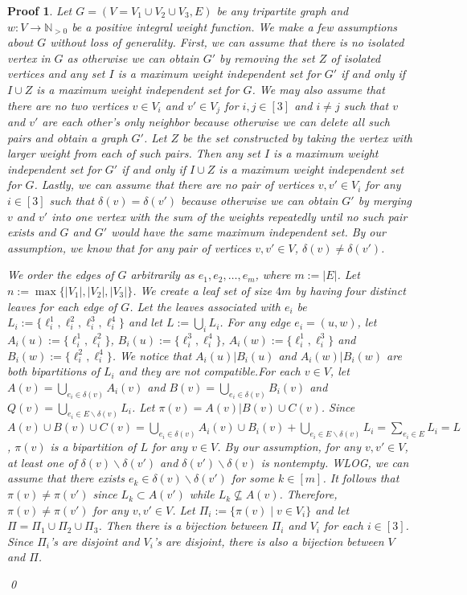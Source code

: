 \documentclass[twocolumn]{bmcart}%
\theoremstyle{mystyle}
\theoremstyle{proofstyle}
\newtheorem*{proof2}{Proof}
\newenvironment{proofnospace}{\begin{proof2}}{\qed \end{proof2}}
\begin{document}
\thmHardness*
\begin{proofnospace}
  Let $G = (V=V_1 \cup V_2 \cup V_3, E)$ be any tripartite graph and $w:V \to \mathbb{N}_{>0}$ be a positive integral weight function. We make a few assumptions about $G$ without loss of generality. First, we can assume that there is no isolated vertex in $G$ as otherwise we can obtain $G'$ by removing the set $Z$ of isolated vertices and any set $I$ is a maximum weight independent set for $G'$ if and only if $I \cup Z$ is a maximum weight independent set for $G$. We may also assume that there are no two vertices $v \in V_i$ and $v' \in V_j$ for $i,j \in [3]$ and $i \neq j$ such that $v$ and $v'$ are each other's only neighbor because otherwise we can delete all such pairs and obtain a graph $G'$. Let $Z$ be the set constructed by taking the vertex with larger weight from each of such pairs. Then any set $I$ is a maximum weight independent set for $G'$ if and only if $I \cup Z$ is a maximum weight independent set for $G$. Lastly, we can assume that there are no pair of vertices $v,v' \in V_i$ for any $i \in [3]$ such that $\delta(v) = \delta(v')$ because otherwise we can obtain $G'$ by merging $v$ and $v'$ into one vertex with the sum of the weights repeatedly until no such pair exists and $G$ and $G'$ would have the same maximum independent set. By our assumption, we know that for any pair of vertices $v,v'\in V$, $\delta(v) \neq \delta(v')$.
  
  We order the edges of $G$ arbitrarily as $e_1,e_2,\dots,e_m$, where $m:=|E|$. Let $n:= \max\{|V_1|,|V_2|,|V_3|\}$. We create a leaf set of size $4m$ by having four distinct leaves for each edge of $G$. Let the leaves associated with $e_i$ be $L_i := \{\ell_i^1,\ell_i^2,\ell_i^3,\ell_i^4\}$ and let $L := \bigcup_i L_i$. For any edge $e_i = (u,w)$, let $A_i(u) := \{\ell_i^1, \ell_i^2\}$, $B_i(u) := \{\ell_i^3, \ell_i^4\}$, $A_i(w) := \{\ell_i^1, \ell_i^3\}$ and $B_i(w) := \{\ell_i^2, \ell_i^4\}$. We notice that $A_i(u)|B_i(u)$ and $A_i(w)|B_i(w)$ are both bipartitions of $L_i$ and they are not compatible.For each $v \in V$, let $A(v) = \bigcup_{e_i \in \delta(v)} A_i(v)$ and $B(v) = \bigcup_{e_i \in \delta(v)} B_i(v)$ and $Q(v) = \bigcup_{e_i \in E\backslash \delta(v)} L_i$. Let $\pi(v) = A(v)|B(v)\cup C(v)$. Since $A(v)\cup B(v) \cup C(v) = \bigcup_{e_i \in \delta(v)} A_i(v) \cup B_i(v) + \bigcup_{e_i \in E\backslash \delta(v)} L_i = \sum_{e_i \in E} L_i = L$, $\pi(v)$ is a bipartition of $L$ for any $v \in V$. By our assumption, for any $v, v' \in V$, at least one of $\delta(v) \backslash \delta(v')$ and $\delta(v') \backslash \delta(v)$ is nontempty. WLOG, we can assume that there exists $e_k \in \delta(v) \backslash \delta(v')$ for some $k \in [m]$. It follows that $\pi(v) \neq \pi(v')$ since $L_k \subset A(v')$ while $L_k \nsubseteq A(v)$. Therefore, $\pi(v) \neq \pi(v')$ for any $v,v' \in V$. Let $\Pi_i := \{\pi(v) \mid v \in V_i\}$ and let $\Pi = \Pi_1 \cup \Pi_2 \cup \Pi_3$. Then there is a bijection between $\Pi_i$ and $V_i$ for each $i \in [3]$. Since $\Pi_i$'s are disjoint and $V_i$'s are disjoint, there is also a bijection between $V$ and $\Pi$. 
  

\end{proofnospace}
\end{document}
